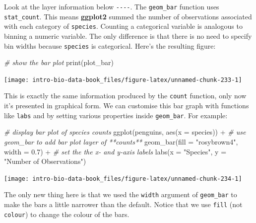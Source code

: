 \documentclass[
]{book}
\newenvironment{Shaded}{\begin{snugshade}}{\end{snugshade}}
\newcommand{\AttributeTok}[1]{\textcolor[rgb]{0.77,0.63,0.00}{#1}}
\newcommand{\CommentTok}[1]{\textcolor[rgb]{0.56,0.35,0.01}{\textit{#1}}}
\newcommand{\FloatTok}[1]{\textcolor[rgb]{0.00,0.00,0.81}{#1}}
\newcommand{\FunctionTok}[1]{\textcolor[rgb]{0.00,0.00,0.00}{#1}}
\newcommand{\NormalTok}[1]{#1}
\newcommand{\SpecialCharTok}[1]{\textcolor[rgb]{0.00,0.00,0.00}{#1}}
\newcommand{\StringTok}[1]{\textcolor[rgb]{0.31,0.60,0.02}{#1}}
\begin{document}
Look at the layer information below \texttt{-\/-\/-\/-}. The \texttt{geom\_bar} function uses \texttt{stat\_count}. This means \textbf{ggplot2} summed the number of observations associated with each category of \texttt{species}. Counting a categorical variable is analogous to binning a numeric variable. The only difference is that there is no need to specify bin widths because \texttt{species} is categorical. Here's the resulting figure:

\begin{Shaded}
\begin{Highlighting}[]
\CommentTok{\# show the bar plot}
\FunctionTok{print}\NormalTok{(plot\_bar)}
\end{Highlighting}
\end{Shaded}

\begin{center}\texttt{[image: intro-bio-data-book\_files/figure-latex/unnamed-chunk-233-1]} \end{center}

This is exactly the same information produced by the \texttt{count} function, only now it's presented in graphical form. We can customise this bar graph with functions like \texttt{labs} and by setting various properties inside \texttt{geom\_bar}. For example:

\begin{Shaded}
\begin{Highlighting}[]
\CommentTok{\# display bar plot of species counts}
\FunctionTok{ggplot}\NormalTok{(penguins, }\FunctionTok{aes}\NormalTok{(}\AttributeTok{x =}\NormalTok{ species)) }\SpecialCharTok{+} 
  \CommentTok{\# use geom\_bar to add bar plot layer of **counts**}
  \FunctionTok{geom\_bar}\NormalTok{(}\AttributeTok{fill =} \StringTok{"rosybrown4"}\NormalTok{, }\AttributeTok{width =} \FloatTok{0.7}\NormalTok{) }\SpecialCharTok{+} 
  \CommentTok{\# set the the x{-} and y{-}axis labels}
  \FunctionTok{labs}\NormalTok{(}\AttributeTok{x =} \StringTok{"Species"}\NormalTok{, }\AttributeTok{y =} \StringTok{"Number of Observations"}\NormalTok{)}
\end{Highlighting}
\end{Shaded}

\begin{center}\texttt{[image: intro-bio-data-book\_files/figure-latex/unnamed-chunk-234-1]} \end{center}

The only new thing here is that we used the \texttt{width} argument of \texttt{geom\_bar} to make the bars a little narrower than the default. Notice that we use \texttt{fill} (not \texttt{colour}) to change the colour of the bars.
\end{document}
